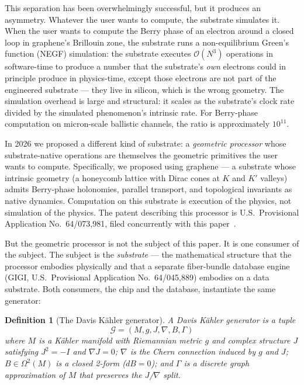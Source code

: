 \documentclass[11pt,letterpaper]{article}
\newtheorem{definition}[theorem]{Definition}
\begin{document}
This separation has been overwhelmingly successful, but it produces an
asymmetry. Whatever the user wants to compute, the substrate
simulates it. When the user wants to compute the Berry phase of an
electron around a closed loop in graphene's Brillouin zone, the
substrate runs a non-equilibrium Green's function (NEGF) simulation:
the substrate executes $\mathcal{O}(N^3)$ operations in
software-time to produce a number that the substrate's \emph{own}
electrons could in principle produce in physics-time, except those
electrons are not part of the engineered substrate --- they live in
silicon, which is the wrong geometry. The simulation overhead is
large and structural: it scales as the substrate's clock rate divided
by the simulated phenomenon's intrinsic rate. For Berry-phase
computation on micron-scale ballistic channels, the ratio is
approximately $10^{11}$.

In 2026 we proposed a different kind of substrate: a \emph{geometric
processor} whose substrate-native operations are themselves the
geometric primitives the user wants to compute. Specifically, we
proposed using graphene --- a substrate whose intrinsic geometry (a
honeycomb lattice with Dirac cones at $K$ and $K'$ valleys) admits
Berry-phase holonomies, parallel transport, and topological
invariants as native dynamics. Computation on this substrate is
execution of the physics, not simulation of the physics. The patent
describing this processor is U.S.\ Provisional Application
No.\ 64/073,981, filed concurrently with this paper~\cite{davis2026dpu}.

But the geometric processor is not the subject of this paper. It is
one consumer of the subject. The subject is the \emph{substrate} ---
the mathematical structure that the processor embodies physically and
that a separate fiber-bundle database engine (GIGI, U.S.\ Provisional
Application No.\ 64/045,889) embodies on a data substrate. Both
consumers, the chip and the database, instantiate the same generator:

\begin{definition}[The Davis K\"ahler generator]
\label{def:generator}
A \emph{Davis K\"ahler generator} is a tuple
\[
\mathcal{G} = (M, g, J, \nabla, B, \Gamma)
\]
where $M$ is a K\"ahler manifold with Riemannian metric $g$ and
complex structure $J$ satisfying $J^2 = -I$ and $\nabla J = 0$;
$\nabla$ is the Chern connection induced by $g$ and $J$;
$B \in \Omega^2(M)$ is a closed 2-form ($dB = 0$); and $\Gamma$ is a
discrete graph approximation of $M$ that preserves the $J$/$\nabla$
split.
\end{definition}
\end{document}
